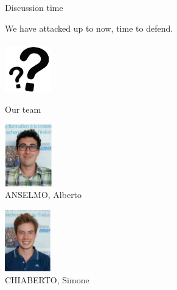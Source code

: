 \documentclass{beamer}
\begin{document}
\begin{frame}[c]{Discussion time}
  \begin{center}
    We have attacked up to now, time to defend.\\
    \Huge{\color{red}{Questions?}}\\
    \vfill
    \hfill
    \includegraphics[height=2cm]{./graphics/qm}
  \end{center}
\end{frame}

\begin{frame}{Our team}
  \noindent
  \begin{minipage}[l][\dimexpr.45\textheight-2\fboxsep-2\fboxrule\relax][t]{\dimexpr .495\textwidth-2\fboxsep-2\fboxrule\relax}
      \begin{center}
        \includegraphics[height=2.7cm]{./graphics/anselmo}\\
        ANSELMO, Alberto
      \end{center}
  \end{minipage}%
  \hfill
  \begin{minipage}[r][\dimexpr 0.45\textheight-2\fboxsep-2\fboxrule\relax][t]{\dimexpr .495\textwidth-2\fboxsep-2\fboxrule\relax}%
      \begin{center}
        \includegraphics[height=2.7cm]{./graphics/chiaberto}\\
        CHIABERTO, Simone
      \end{center}
  \end{minipage}%
  \vfill
  \noindent
  \begin{minipage}[l][\dimexpr 0.45\textheight-2\fboxsep-2\fboxrule\relax][t]{\dimexpr .495\textwidth-2\fboxsep-2\fboxrule\relax}%

\end{minipage}
\end{frame}
\end{document}
